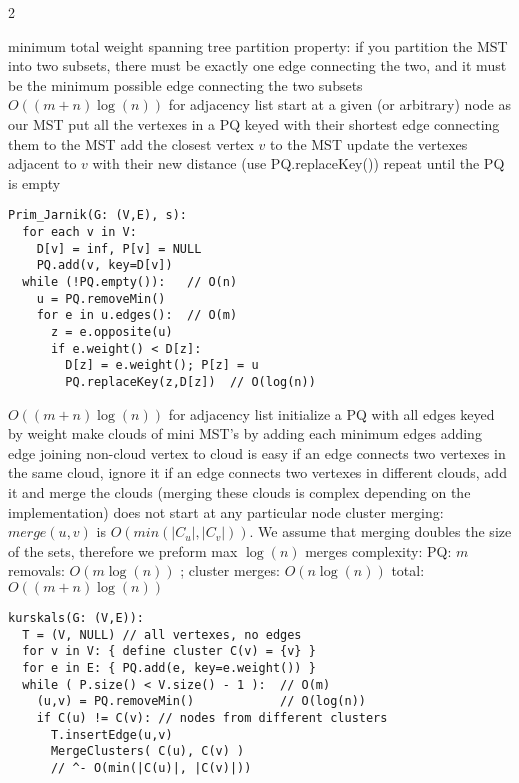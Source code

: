 \documentclass{article}
\def \columncount {2}
\begin{document}
\begin{multicols*}{\columncount}
\begin{outline}[longenum]
  \1 minimum total weight spanning tree
  \1 partition property: if you partition the MST into two subsets, there must be exactly one edge connecting the two, and it must be the minimum possible edge connecting the two subsets
  \1 $O( (m+n)\log(n) )$ for adjacency list
  \1 start at a given (or arbitrary) node as our MST
  \1 put all the vertexes in a PQ keyed with their shortest edge connecting them to the MST
  \1 add the closest vertex $v$ to the MST
  \1 update the vertexes adjacent to $v$ with their new distance (use PQ.replaceKey())
  \1 repeat until the PQ is empty
\0 \vspace{-0.23cm}
\begin{lstlisting}
Prim_Jarnik(G: (V,E), s):
  for each v in V:
    D[v] = inf, P[v] = NULL
    PQ.add(v, key=D[v])
  while (!PQ.empty()):   // O(n)
    u = PQ.removeMin()
    for e in u.edges():  // O(m)
      z = e.opposite(u)
      if e.weight() < D[z]:
        D[z] = e.weight(); P[z] = u
        PQ.replaceKey(z,D[z])  // O(log(n))
\end{lstlisting} \vspace{-0.23cm}
  \1 $O( (m+n)\log(n) )$ for adjacency list
  \1 initialize a PQ with all edges keyed by weight
  \1 make clouds of mini MST's by adding each minimum edges
    \2 adding edge joining non-cloud vertex to cloud is easy
    \2 if an edge connects two vertexes in the same cloud, ignore it
    \2 if an edge connects two vertexes in different clouds, add it and merge the clouds (merging these clouds is complex depending on the implementation)
  \1 does not start at any particular node
  \1 cluster merging: $merge(u,v)$ is $O(min(|C_u|,|C_v|))$. We assume that merging doubles the size of the sets, therefore we preform max $\log(n)$ merges
  \1 complexity:
    \2 PQ: $m$ removals: $O(m\log(n))$
    ; cluster merges: $O(n\log(n))$
    \2 total: $O( (m+n) \log(n))$
\0 \vspace{-0.23cm}
\begin{lstlisting}
kurskals(G: (V,E)):
  T = (V, NULL) // all vertexes, no edges 
  for v in V: { define cluster C(v) = {v} }
  for e in E: { PQ.add(e, key=e.weight()) }
  while ( P.size() < V.size() - 1 ):  // O(m)
    (u,v) = PQ.removeMin()            // O(log(n))
    if C(u) != C(v): // nodes from different clusters
      T.insertEdge(u,v)
      MergeClusters( C(u), C(v) )
      // ^- O(min(|C(u)|, |C(v)|))
\end{lstlisting} \vspace{-0.23cm}


\end{outline}
\end{multicols*}
\end{document}
